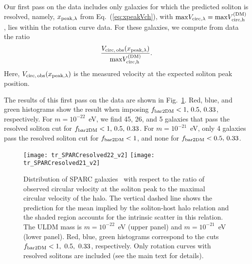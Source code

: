 \documentclass[aps,prd,floats,superscriptaddress,showpacs,nofootinbib,twocolumn,preprintnumbers]{revtex4-1}%
\def\be{\begin{eqnarray}}
\def\ee{\end{eqnarray}}
\begin{document}
Our first pass on the data includes only galaxies for which the
predicted soliton is resolved, namely, $x_{\rm peak,\lambda}$ from
Eq.~(\ref{eq:xpeakVch}), with ${\rm max} V_{\rm circ,\lambda}={\rm
  max} V_{\rm circ,h}^{\rm (DM)}$, lies within the rotation curve data. For these
galaxies, we compute from data the ratio 
%
\be\frac{V_{\rm circ,\,obs}(x_{\rm peak,\lambda})}{{\rm max} V_{\rm circ,h}^{\rm (DM)}}.\ee
%
Here, $V_{\rm circ,\,obs}(x_{\rm peak,\lambda})$ is the measured
velocity at the expected soliton peak position. 

The results of this first pass on the data are shown in
Fig.~\ref{fig:sparc1}. Red, blue, and green histograms show the result when imposing $f_{\rm bar2DM}<1,\,0.5,\,0.33$, respectively. For $m=10^{-22}$~eV, we find 45, 26, and 5 galaxies that pass the resolved soliton cut
for $f_{\rm bar2DM}<1,\,0.5,\,0.33$. For $m=10^{-21}$~eV, only 4 galaxies pass the resolved soliton cut for $f_{\rm bar2DM}<1$, and none for $f_{\rm bar2DM}<0.5,\,0.33$.
%
\begin{figure}[hbp!]
\centering
\texttt{[image: tr\_SPARCresolved22\_v2]}
\texttt{[image: tr\_SPARCresolved21\_v2]}
\caption{Distribution of SPARC galaxies~\cite{Lelli:2016zqa} with
  respect to the ratio of observed circular velocity at the soliton
  peak to the maximal circular velocity of the halo. The vertical
  dashed line shows the prediction for the mean implied by
  the soliton-host halo relation and the shaded region accounts for
  the intrinsic scatter in this relation. The ULDM mass is
  $m=10^{-22}$~eV (upper panel) and $m=10^{-21}$~eV (lower panel).
Red, blue, green histograms correspond to the cuts $f_{\rm bar2DM} <1,
~0.5,~ 0.33$, respectively.
Only rotation curves with resolved solitons are included (see the main
text for details).
}\label{fig:sparc1}
\end{figure}
%
\end{document}
